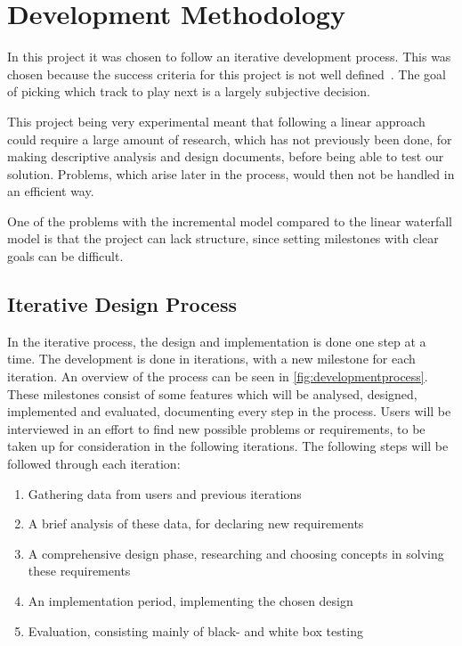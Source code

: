\chapter{Development Methodology}

In this project it was chosen to follow an iterative development process. This was chosen because the success criteria for this project is not well defined~\cite{dahlbom1993computers}. The goal of picking which track to play next is a largely subjective decision.

This project being very experimental meant that following a linear approach could require a large amount of research, which has not previously been done, for making descriptive analysis and design documents, before being able to test our solution. Problems, which arise later in the process, would then not be handled in an efficient way.

One of the problems with the incremental model compared to the linear waterfall model is that the project can lack structure, since setting milestones with clear goals can be difficult.

\section{Iterative Design Process}
\label{IterativeDesignProcess}
In the iterative process, the design and implementation is done one
step at a time. The development is done in iterations, with a new
milestone for each iteration. An overview of the process can be seen
in \cref{fig:developmentprocess}. These milestones consist of some
features which will be analysed, designed, implemented and evaluated,
documenting every step in the process. Users will be interviewed in an
effort to find new possible problems or requirements, to be taken up
for consideration in the following iterations. The following steps
will be followed through each iteration:

\begin{enumerate}
  \item Gathering data from users and previous iterations
  \item A brief analysis of these data, for declaring new requirements
  \item A comprehensive design phase, researching and choosing concepts in solving these requirements
  \item An implementation period, implementing the chosen design
  \item Evaluation, consisting mainly of black- and white box testing
\end{enumerate}

